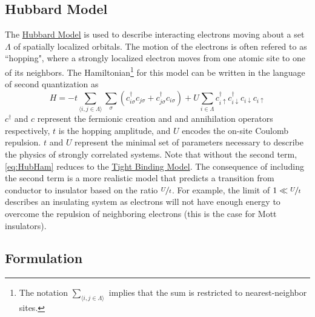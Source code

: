 \documentclass[12pt]{article}
\newcommand{\lrp}[1]{\left( #1 \right)}
\begin{document}
\subsection{Hubbard Model} %
The \href{https://en.wikipedia.org/wiki/Hubbard_model}{Hubbard Model} is used to describe interacting electrons moving about a set $\Lambda$ of spatially localized orbitals. The motion of the electrons is often refered to as ``hopping", where a strongly localized electron moves from one atomic site to one of its neighbors. The Hamiltonian\footnote{The notation $\sum_{\langle i,j\in \Lambda\rangle}$ implies that the sum is restricted to nearest-neighbor sites.} for this model can be written in the language of second quantization as 
\begin{equation}\label{eq:HubHam}
    H = -t\sum_{\langle i,j\in \Lambda\rangle}\sum_{\sigma}\lrp{c^{\dagger}_{i\sigma}c_{j\sigma}+c^{\dagger}_{j\sigma}c_{i\sigma}}+U\sum_{i\in \Lambda}c^{\dagger}_{i\uparrow}c^{\dagger}_{i\downarrow}c_{i\downarrow}c_{i\uparrow}
\end{equation}
$c^{\dagger}$ and $c$ represent the fermionic creation and and annihilation operators respectively, $t$ is the hopping amplitude, and $U$ encodes the on-site Coulomb repulsion. $t$ and $U$ represent the minimal set of parameters necessary to describe the physics of strongly correlated systems. Note that without the second term,  \eqref{eq:HubHam} reduces to the \href{https://en.wikipedia.org/wiki/Tight_binding}{Tight Binding Model}. The consequence of including the second term is a more realistic model that predicts a transition from conductor to insulator based on the ratio $\nicefrac{U}{t}$. For example, the limit of $1\ll \nicefrac{U}{t}$ describes an insulating system as electrons will not have enough energy to overcome the repulsion of neighboring electrons (this is the case for Mott insulators). 

\subsection{Formulation}
\end{document}
